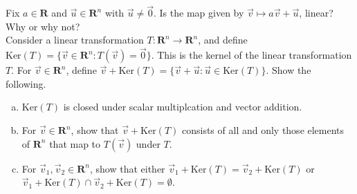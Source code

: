 \documentclass[a4paper,11pt]{article}
\newcommand{\R}{\mathbf{R}}
\begin{document}
 Fix $a \in \R$ and $\vec u \in \R^n$ with $\vec
u \neq \vec 0$. Is the map given by $\vec v \mapsto a\vec v + \vec u$, linear?
Why or why not? \\

 Consider a linear transformation $T: \R^n
\rightarrow \R^n$, and define $\text{Ker}(T)=\{\vec v \in \R^n : T(\vec v)=\vec
0\}$. This is the kernel of the linear transformation $T$. For $\vec v \in
\R^n$, define $\vec v + \text{Ker}(T)=\{\vec v + \vec u : \vec u \in
\text{Ker}(T)\}$. Show the following.
\begin{enumerate}[(a)]
\item $\text{Ker}(T)$ is closed under scalar multiplcation and vector addition.
\item For $\vec v \in \R^n$, show that $\vec v + \text{Ker}(T)$ consists of all
  and only those elements of $\R^n$ that map to $T(\vec v)$ under $T$.
\item For $\vec v_1,\vec v_2 \in \R^n$, show that either $\vec
  v_1+\text{Ker}(T)=\vec v_2 +\text{Ker}(T)$ or $\vec v_1+\text{Ker}(T) \cap
  \vec v_2 +\text{Ker}(T)=\emptyset$.
\end{enumerate}
\end{document}
